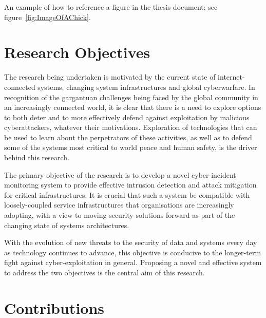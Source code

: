 An example of how to reference a figure in the thesis document; see figure~\ref{fig:ImageOfAChick}.



\section{Research Objectives} 
The research being undertaken is motivated by the current state of internet-connected systems, changing system infrastructures and global cyberwarfare. In recognition of the gargantuan challenges being faced by the global community in an increasingly connected world, it is clear that there is a need to explore options to both deter and to more effectively defend against exploitation by malicious cyberattackers, whatever their motivations. Exploration of technologies that can be used to learn about the perpetrators of these activities, as well as to defend some of the systems most critical to world peace and human safety, is the driver behind this research. 

The primary objective of the research is to	develop a novel cyber-incident monitoring system to provide effective intrusion detection and attack mitigation for critical infrastructures. It is crucial that such a system be compatible with loosely-coupled service infrastructures that organisations are increasingly adopting, with a view to moving security solutions forward as part of the changing state of systems architectures.

With the evolution of new threats to the security of data and systems every day as technology continues to advance, this objective is conducive to the longer-term fight against cyber-exploitation in general. Proposing a novel and effective system to address the two objectives is the central aim of this research.

\section{Contributions}

